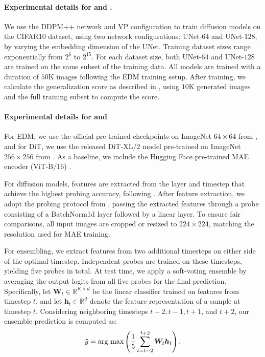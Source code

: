 \paragraph{Experimental details for  and .}
We use the DDPM++ network and VP configuration to train diffusion models\citep{karras2022elucidating} on the CIFAR10 dataset, using two network configurations: UNet-$64$ and UNet-$128$, by varying the embedding dimension of the UNet. Training dataset sizes range exponentially from $2^6$ to $2^{15}$. For each dataset size, both UNet-$64$ and UNet-$128$ are trained on the same subset of the training data. All models are trained with a duration of $50$K images following the EDM training setup. After training, we calculate the generalization score as described in \citet{zhang2024emergence}, using $10$K generated images and the full training subset to compute the score.

\paragraph{Experimental details for  and }

For EDM, we use the official pre-trained checkpoints on ImageNet $64\times64$ from \citep{karras2022elucidating}, and for DiT, we use the released DiT-XL/2 model pre-trained on ImageNet $256\times256$ from \citep{peebles2023scalable}. As a baseline, we include the Hugging Face pre-trained MAE encoder (ViT-B/16) \citep{he2022masked}.

For diffusion models, features are extracted from the layer and timestep that achieve the highest probing accuracy, following \citep{xiang2023denoising}. After feature extraction, we adopt the probing protocol from \citep{chen2024deconstructing}, passing the extracted features through a probe consisting of a BatchNorm1d layer followed by a linear layer. To ensure fair comparisons, all input images are cropped or resized to $224\times224$, matching the resolution used for MAE training.

For ensembling, we extract features from two additional timesteps on either side of the optimal timestep. Independent probes are trained on these timesteps, yielding five probes in total. At test time, we apply a soft-voting ensemble by averaging the output logits from all five probes for the final prediction. Specifically, let $\bm W_t \in \mathbb{R}^{K \times d}$ be the linear classifier trained on features from timestep $t$, and let $\bm h_t \in \mathbb{R}^{d}$ denote the feature representation of a sample at timestep $t$. Considering neighboring timesteps $t-2, t-1, t+1$, and $t+2$, our ensemble prediction is computed as:
\begin{align*} 
    \bm \hat{y} = \operatorname*{\text{arg~max}}\left(\frac{1}{5}\sum_{t=t-2}^{t+2} \bm W_t \bm h_t\right). 
\end{align*}

